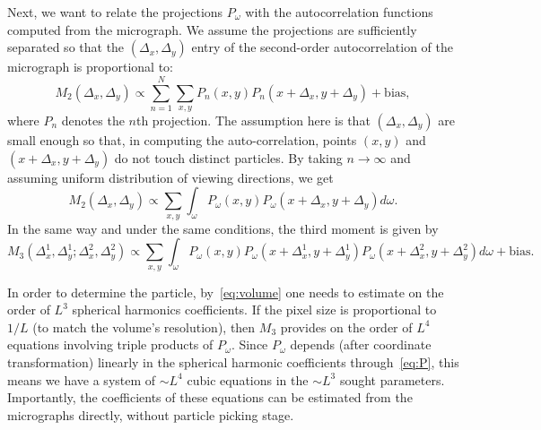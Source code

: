 \documentclass[english,11pt]{article}
\newcommand{\1}{\mathbf{1}}
\numberwithin{equation}{section}
\theoremstyle{plain}
\theoremstyle{definition}
\theoremstyle{remark}
\theoremstyle{plain}
\theoremstyle{remark}
\theoremstyle{plain}
\theoremstyle{plain}
\begin{document}
Next, we want to relate the projections $P_\omega$ with the autocorrelation functions computed from the micrograph.
We assume the projections are sufficiently separated so that the $(\Delta_x,\Delta_y)$ entry of the second-order autocorrelation of the micrograph is proportional to:
\begin{equation}
	M_2(\Delta_x, \Delta_y) \propto \sum_{n=1}^N \sum_{x,y}P_n(x,y)P_n(x+\Delta_x,y+\Delta_y) + \textrm{bias},
\end{equation}
where $P_n$ denotes the $n$th projection. The assumption here is that $(\Delta_x, \Delta_y)$ are small enough so that, in computing the auto-correlation, points $(x, y)$ and $(x+\Delta_x, y+\Delta_y)$ do not touch distinct particles. By taking $n\to\infty$ and assuming uniform distribution of viewing directions, we get 
\begin{equation}
M_2(\Delta_x,\Delta_y)\propto\sum_{x,y}\int_{\omega} P_\omega(x,y)P_\omega(x+\Delta_x,y+\Delta_y)d\omega.
\end{equation}
In the same way and under the same conditions, the third moment is given by 
\begin{equation} 
M_3(\Delta_x^1,\Delta_y^1;\Delta_x^2,\Delta_y^2) \propto \sum_{x,y}\int_{\omega} P_\omega(x,y)P_\omega(x+\Delta_x^1,y+\Delta_y^1)P_\omega(x+\Delta_x^2,y+\Delta_y^2)d\omega + \textrm{bias}.
\end{equation}

In order to determine the particle, by~\eqref{eq:volume} one needs to estimate on the order of $L^3$ spherical harmonics coefficients. If the pixel size is proportional to $1/L$ (to match the volume's resolution), then $M_3$ provides on the order of $L^4$ equations involving triple products of $P_\omega$. Since $P_\omega$ depends (after coordinate transformation) linearly in the spherical harmonic coefficients through~\eqref{eq:P}, this means we have a system of $\sim L^4$ cubic equations in the $\sim L^3$ sought parameters. Importantly, the coefficients of these equations can be estimated from the micrographs directly, without particle picking stage.
\end{document}
